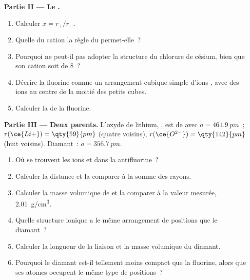\begin{problem}
\medskip
\noindent\textbf{Partie II --- Le .}
\begin{enumerate}[resume]
  \item Calculer $x = r_+/r_-$.
  \item Quelle  du cation la règle du 
        permet-elle~?
  \item Pourquoi  ne peut-il pas adopter la structure du
        chlorure de césium, bien que son cation soit de  8~?
  \item Décrire la fluorine comme un arrangement cubique simple d'ions
        , avec des ions  au centre de la moitié des
        petits cubes.
  \item Calculer la  de la fluorine.
\end{enumerate}

\medskip
\noindent\textbf{Partie III --- Deux parents.}
L'oxyde de lithium, , est de  avec
$a = \qty{461.9}{pm}$~;
$r(\ce{Li+}) = \qty{59}{pm}$ (quatre voisins), $r(\ce{O^{2-}}) =
\qty{142}{pm}$ (huit voisins). Diamant~: $a = \qty{356.7}{pm}$.
\begin{enumerate}[resume]
  \item Où se trouvent les ions  et  dans la 
        antifluorine~?
  \item Calculer la distance  et la comparer à la somme des
        rayons.
  \item Calculer la masse volumique de  et la comparer à la
        valeur mesurée, \qty{2.01}{g/cm^3}.
  \item Quelle structure ionique a le même arrangement de positions que
        le diamant~?
  \item Calculer la longueur de la liaison  et la masse
        volumique du diamant.
  \item Pourquoi le diamant est-il tellement moins compact que la
        fluorine, alors que ses atomes occupent le même type de
        positions~?
\end{enumerate}


\end{problem}
